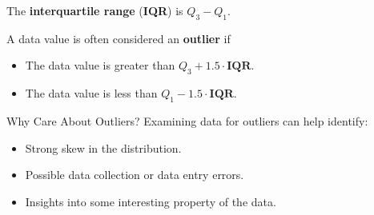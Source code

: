 \documentclass{beamer}
\begin{document}
\begin{frame}
\begin{definition}
The \textbf{interquartile range} (\textbf{IQR}) is $Q_3-Q_1$.
\end{definition}\pause

\begin{definition}
A data value is often considered an \textbf{outlier} if
\begin{itemize}
\item  The data value is greater than $Q_3 + 1.5\cdot\textbf{IQR}$.
\item  The data value is less than $Q_1 - 1.5\cdot\textbf{IQR}$.
\end{itemize}
\end{definition}\pause

\begin{block}{Why Care About Outliers?}
Examining data for outliers can help identify:
\begin{itemize}
\item Strong skew in the distribution.\pause
\item Possible data collection or data entry errors.\pause
\item Insights into some interesting property of the data.
\end{itemize}
\end{block}
\end{frame}
\end{document}
